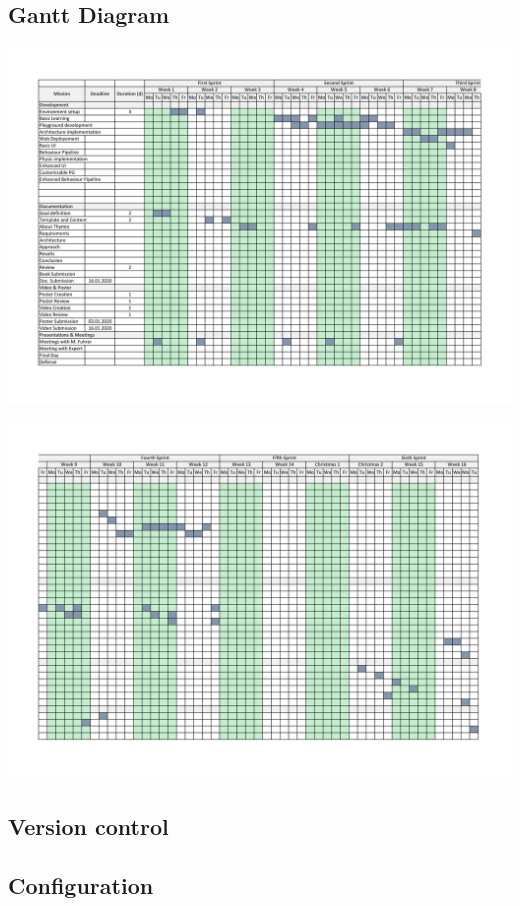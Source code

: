 \documentclass{scrartcl}
\begin{document}
\subsection{Gantt Diagram}
\begin{center}
  \includegraphics[width=\textwidth]{./Gantt-1}
\end{center}
\begin{center}
  \includegraphics[width=\textwidth]{./Gantt-2}
\end{center}

\subsection{Version control}

\subsection{Configuration}
\end{document}
